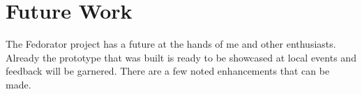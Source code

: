         
    \section{Future Work}
        The Fedorator project has a future at the hands of me and other enthusiasts.  Already the prototype that was built is ready to be showcased at local events and feedback will be garnered.  There are a few noted enhancements that can be made.
        
        
